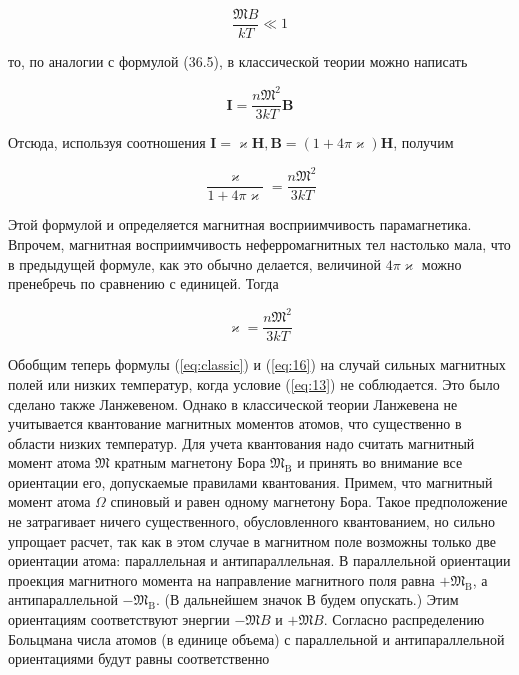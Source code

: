 \documentclass[12pt]{article}
\begin{document}
  \begin{equation}
  \label{eq:13}
  \frac{\mathfrak{M} B}{k T} \ll 1
  \end{equation}

  то, по аналогии с формулой (36.5), в классической теории можно написать

  \begin{equation}
  \label{eq:classic}
  \mathbf{I}=\frac{n \mathfrak{M}^2}{3 k T} \mathbf{B}
  \end{equation}

  Отсюда, используя соотношения $\mathbf{I}=\varkappa \mathbf{H}, \mathbf{B}=(1+4 \pi \varkappa) \mathbf{H}$, получим

  \begin{equation}
  \frac{\varkappa}{1+4 \pi \varkappa}=\frac{n \mathfrak{M}^2}{3 k T}
  \end{equation}


  Этой формулой и определяется магнитная восприимчивость парамагнетика. Впрочем, магнитная восприимчивость неферромагнитных тел настолько мала, что в предыдущей формуле, как это обычно делается, величиной $4 \pi \varkappa$ можно пренебречь по сравнению с единицей. Тогда

  \begin{equation}
  \label{eq:16}
  \varkappa=\frac{n \mathfrak{M}^2}{3 k T}
  \end{equation}

  Обобщим теперь формулы (\ref{eq:classic}) и (\ref{eq:16}) на случай сильных магнитных полей или низких температур, когда условие (\ref{eq:13}) не соблюдается. Это было сделано также Ланжевеном. Однако в классической теории Ланжевена не учитывается квантование магнитных моментов атомов, что существенно в области низких температур. Для учета квантования надо считать магнитный момент атома $\mathfrak{M}$ кратным магнетону Бора $\mathfrak{M}_{\mathrm{B}}$ и принять во внимание все ориентации его, допускаемые правилами квантования. Примем, что магнитный момент атома $\mathfrak{\Omega}$ спиновый и равен одному магнетону Бора. Такое предположение не затрагивает ничего существенного, обусловленного квантованием, но сильно упрощает расчет, так как в этом случае в магнитном поле возможны только две ориентации атома: параллельная и антипараллельная. В параллельной ориентации проекция магнитного момента на направление магнитного поля равна $+\mathfrak{M}_{\mathrm{B}}$, а антипараллельной $-\mathfrak{M}_{\mathrm{B}}$. (В дальнейшем значок В будем опускать.) Этим ориентациям соответствуют энергии $-\mathfrak{M} B$ и $+\mathfrak{M} B$. Согласно распределению Больцмана числа атомов (в единице объема) с параллельной и антипараллельной
  ориентациями будут равны соответственно
\end{document}

